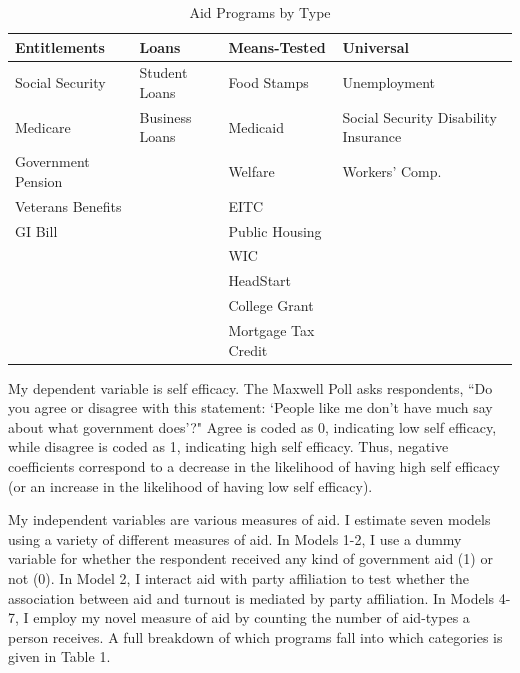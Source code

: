 \documentclass[12pt]{paper}
\begin{document}
\begin{table}[]
	\begin{adjustbox}{width=1\textwidth}
		\begin{tabular}{llll}
			\hline
			\textbf{Entitlements} & \textbf{Loans} & \textbf{Means-Tested} & \textbf{Universal}                   \\ \hline
			Social Security       & Student Loans  & Food Stamps           & Unemployment                         \\
			Medicare              & Business Loans & Medicaid              & Social Security Disability Insurance \\
			Government Pension    &                & Welfare               & Workers' Comp.                       \\
			Veterans Benefits     &                & EITC                  &                                      \\
			GI Bill               &                & Public Housing        &                                      \\
			&                & WIC                   &                                      \\
			&                & HeadStart             &                                      \\
			&                & College Grant         &                                      \\
			&                & Mortgage Tax Credit   &                                      \\ \hline
		\end{tabular}
	\end{adjustbox}
	\caption{Aid Programs by Type} 
	\label{}
\end{table}

My dependent variable is self efficacy. The Maxwell Poll asks respondents, ``Do you agree or disagree with this statement: `People like me don’t have much say about what government does'?" Agree is coded as 0, indicating low self efficacy, while disagree is coded as 1, indicating high self efficacy. Thus, negative coefficients correspond to a decrease in the likelihood of having high self efficacy (or an increase in the likelihood of having low self efficacy).

My independent variables are various measures of aid. I estimate seven models using a variety of different measures of aid. In Models 1-2, I use a dummy variable for whether the respondent received any kind of government aid (1) or not (0). In Model 2, I interact aid with party affiliation to test whether the association between aid and turnout is mediated by party affiliation. In Models 4-7, I employ my novel measure of aid by counting the number of aid-types a person receives. A full breakdown of which programs fall into which categories is given in Table 1.
\end{document}
